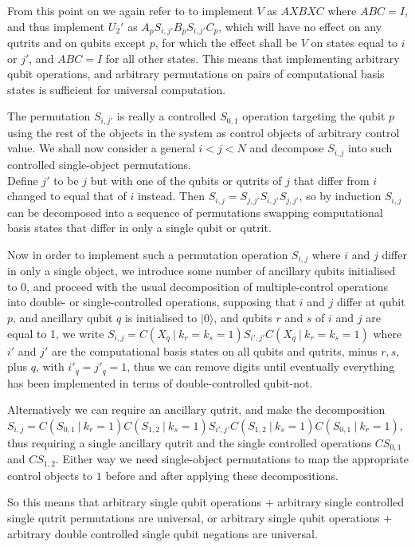 \documentclass[]{article}
\newcommand{\ket}[1]{| #1 \rangle}
\begin{document}
From this point on we again refer to \cite{textbook} to implement $V$ as $AXBXC$ where $ABC=I$, and thus implement $U_2'$ as $A_pS_{i,j'}B_pS_{i,j'}C_p$, which will have no effect on any qutrits and on qubits except $p$, for which the effect shall be $V$ on states equal to $i$ or $j'$, and $ABC=I$ for all other states. This means that implementing arbitrary qubit operations, and arbitrary permutations on pairs of computational basis states is sufficient for universal computation.

The permutation $S_{i,j'}$ is really a controlled $S_{0,1}$ operation targeting the qubit $p$ using the rest of the objects in the system as control objects of arbitrary control value. We shall now consider a general $i < j < N$ and decompose $S_{i,j}$ into such controlled single-object permutations.
\\Define $j'$ to be $j$ but with one of the qubits or qutrits of $j$ that differ from $i$ changed to equal that of $i$ instead. Then $S_{i,j} = S_{j,j'}S_{i,j'}S_{j,j'}$, so by induction $S_{i,j}$ can be decomposed into a sequence of permutations swapping computational basis states that differ in only a single qubit or qutrit.

Now in order to implement such a permutation operation $S_{i,j}$ where $i$ and $j$ differ in only a single object, we introduce some number of ancillary qubits initialised to 0, and proceed with the usual decomposition of multiple-control operations into double- or single-controlled operations, supposing that $i$ and $j$ differ at qubit $p$, and ancillary qubit $q$ is initialised to $\ket{0}$, and qubits $r$ and $s$ of $i$ and $j$ are equal to 1, we write $S_{i,j} = C(X_q\ |\ k_r=k_s=1)S_{i',j'}C(X_q\ |\ k_r=k_s=1)$ where $i'$ and $j'$ are the computational basis states on all qubits and qutrits, minus $r, s$, plus $q$, with $i'_q=j'_q=1$, thus we can remove digits until eventually everything has been implemented in terms of double-controlled qubit-not.

Alternatively we can require an ancillary qutrit, and make the decomposition $S_{i,j} = C(S_{0,1}\ |\ k_r=1)C(S_{1,2}\ |\ k_s=1)S_{i',j'}C(S_{1,2}\ |\ k_s=1)C(S_{0,1}\ |\ k_r=1)$, thus requiring a single ancillary qutrit and the single controlled operations $CS_{0,1}$ and $CS_{1,2}$. Either way we need single-object permutations to map the appropriate control objects to $1$ before and after applying these decompositions.

So this means that arbitrary single qubit operations + arbitrary single controlled single qutrit permutations are universal, or arbitrary single qubit operations + arbitrary double controlled single qubit negations are universal.
\end{document}
